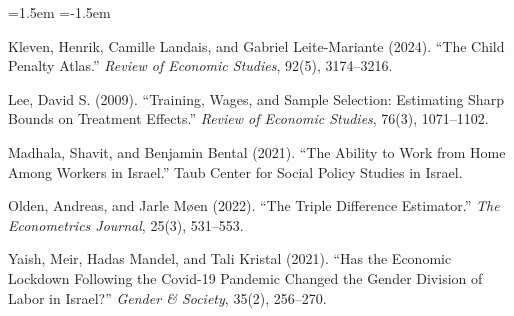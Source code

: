 \documentclass[11pt]{article}
\begin{document}
\begin{list}{}{\leftmargin=1.5em \itemindent=-1.5em}
\item Kleven, Henrik, Camille Landais, and Gabriel Leite-Mariante (2024). ``The Child Penalty Atlas.'' \textit{Review of Economic Studies}, 92(5), 3174--3216.

\item Lee, David S. (2009). ``Training, Wages, and Sample Selection: Estimating Sharp Bounds on Treatment Effects.'' \textit{Review of Economic Studies}, 76(3), 1071--1102.

\item Madhala, Shavit, and Benjamin Bental (2021). ``The Ability to Work from Home Among Workers in Israel.'' Taub Center for Social Policy Studies in Israel.

\item Olden, Andreas, and Jarle M\o{}en (2022). ``The Triple Difference Estimator.'' \textit{The Econometrics Journal}, 25(3), 531--553.

\item Yaish, Meir, Hadas Mandel, and Tali Kristal (2021). ``Has the Economic Lockdown Following the Covid-19 Pandemic Changed the Gender Division of Labor in Israel?'' \textit{Gender \& Society}, 35(2), 256--270.

\end{list}
\end{document}
